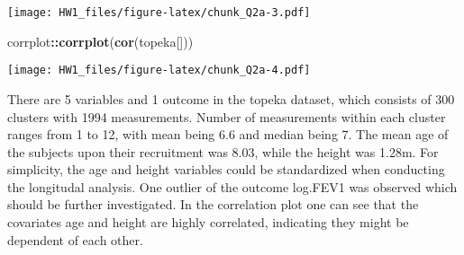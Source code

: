 \documentclass[
]{article}
\newenvironment{Shaded}{\begin{snugshade}}{\end{snugshade}}
\newcommand{\FunctionTok}[1]{\textcolor[rgb]{0.13,0.29,0.53}{\textbf{#1}}}
\newcommand{\NormalTok}[1]{#1}
\newcommand{\SpecialCharTok}[1]{\textcolor[rgb]{0.81,0.36,0.00}{\textbf{#1}}}
\begin{document}
\texttt{[image: HW1\_files/figure-latex/chunk\_Q2a-3.pdf]}

\begin{Shaded}
\begin{Highlighting}[]
\NormalTok{corrplot}\SpecialCharTok{::}\FunctionTok{corrplot}\NormalTok{(}\FunctionTok{cor}\NormalTok{(topeka[]))}
\end{Highlighting}
\end{Shaded}

\texttt{[image: HW1\_files/figure-latex/chunk\_Q2a-4.pdf]}

There are 5 variables and 1 outcome in the topeka dataset, which
consists of 300 clusters with 1994 measurements. Number of measurements
within each cluster ranges from 1 to 12, with mean being 6.6 and median
being 7. The mean age of the subjects upon their recruitment was 8.03,
while the height was 1.28m. For simplicity, the age and height variables
could be standardized when conducting the longitudal analysis. One
outlier of the outcome log.FEV1 was observed which should be further
investigated. In the correlation plot one can see that the covariates
age and height are highly correlated, indicating they might be dependent
of each other.
\end{document}
